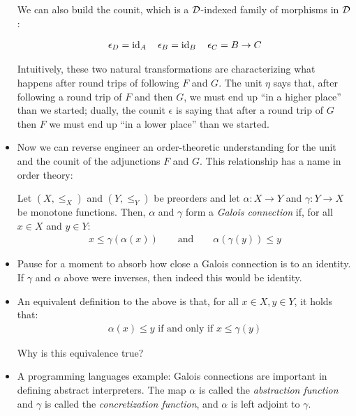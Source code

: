 \begin{itemize}
  We can also build the counit, which is a $\mathcal D$-indexed family of morphisms in $\mathcal D$:

  \begin{align*}
    \epsilon_D = \operatorname{id}_A \quad \epsilon_B = \operatorname{id}_B \quad \epsilon_C = B \to C 
  \end{align*}

  Intuitively, these two natural transformations are characterizing what happens 
  after round trips of following $F$ and $G$. The unit $\eta$ says that, after 
  following a round trip of $F$ and then $G$, we must end up ``in a higher place'' than we started;
  dually, the counit $\epsilon$ is saying that after a round trip of $G$ then $F$ 
  we must end up ``in a lower place'' than we started.

  \item Now we can reverse engineer an order-theoretic understanding for the 
  unit and the counit of the adjunctions $F$ and $G$.
  This relationship has a name in order theory:

  \begin{definition}
    Let $(X, \le_X)$ and $(Y, \le_Y)$  be preorders and let $\alpha : X \to Y$ 
    and $\gamma : Y \to X$ be monotone functions. Then, $\alpha$ and 
    $\gamma$ form a \emph{Galois connection} if, for all $x \in X$ and $y \in Y$:
    \begin{align*}
      x \le \gamma(\alpha(x))  \qquad \text{and} \qquad \alpha(\gamma(y)) \le y
    \end{align*}
  \end{definition}

  \item Pause for a moment to absorb how close a Galois connection is to an identity. 
  If $\gamma$ and $\alpha$ above were inverses, then indeed this would be 
  identity.

  \item An equivalent definition to the above is that, for all $x \in X, y \in Y$, 
  it holds that:
  \begin{align}
    \alpha(x) \le y \text{ if and only if } x \le \gamma(y)
    \label{eq:galois-hom}
  \end{align}

  Why is this equivalence true? 

  \item A programming languages example: Galois connections are important in defining 
  abstract interpreters. The map $\alpha$ is called the \emph{abstraction function} and 
  $\gamma$ is called the \emph{concretization function}, and $\alpha$ is left adjoint to $\gamma$.

\end{itemize}

